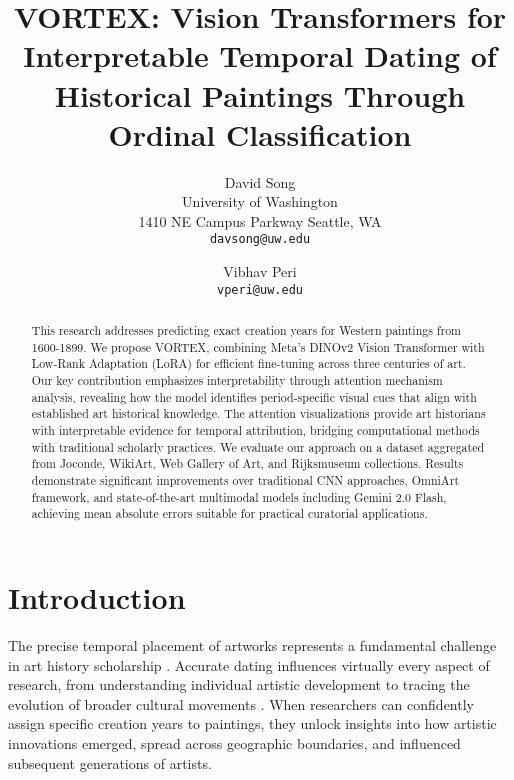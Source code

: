 \documentclass[10pt,twocolumn,letterpaper]{article}
\begin{document}
\title{VORTEX: Vision Transformers for Interpretable Temporal Dating of Historical Paintings Through Ordinal Classification}

\author{David Song\\
University of Washington\\
1410 NE Campus Parkway Seattle, WA\\
{\tt\small davsong@uw.edu}
\and
Vibhav Peri\\
{\tt\small vperi@uw.edu}
}
\maketitle

\begin{abstract}
This research addresses predicting exact creation years for Western paintings from 1600-1899. We propose VORTEX, combining Meta's DINOv2 Vision Transformer with Low-Rank Adaptation (LoRA) for efficient fine-tuning across three centuries of art. Our key contribution emphasizes interpretability through attention mechanism analysis, revealing how the model identifies period-specific visual cues that align with established art historical knowledge. The attention visualizations provide art historians with interpretable evidence for temporal attribution, bridging computational methods with traditional scholarly practices. We evaluate our approach on a dataset aggregated from Joconde, WikiArt, Web Gallery of Art, and Rijksmuseum collections. Results demonstrate significant improvements over traditional CNN approaches, OmniArt framework, and state-of-the-art multimodal models including Gemini 2.0 Flash, achieving mean absolute errors suitable for practical curatorial applications.

\end{abstract}

\section{Introduction}


The precise temporal placement of artworks represents a fundamental challenge in art history scholarship \cite{Mishory00}. Accurate dating influences virtually every aspect of research, from understanding individual artistic development to tracing the evolution of broader cultural movements \cite{Elgammal18}. When researchers can confidently assign specific creation years to paintings, they unlock insights into how artistic innovations emerged, spread across geographic boundaries, and influenced subsequent generations of artists.
\end{document}
